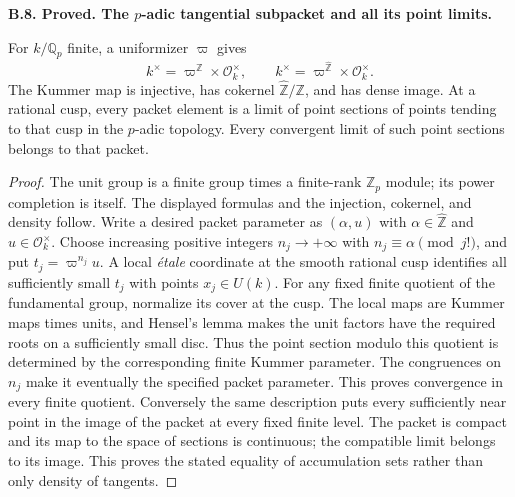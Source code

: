 \documentclass[11pt,oneside]{article}
\makeatletter
\newcounter{statementanchor}
\newenvironment{statement}[3]{%
 \refstepcounter{statementanchor}\def\@currentlabel{#1}%
 \par\addvspace{9pt}\noindent
 \textbf{#1. #2. #3.}\par\nobreak\noindent\ignorespaces
}{\par\addvspace{5pt}}
\makeatother
\begin{document}
\begin{statement}{B.8}{Proved}{The $p$-adic tangential subpacket and all its point limits}
\label{st:B.8}

For $k/\mathbb Q_p$ finite, a uniformizer $\varpi$ gives
\[
 k^\times=\varpi^{\mathbb Z}\times\mathcal O_k^\times,
 \qquad \widehat{k^\times}=\varpi^{\widehat{\mathbb Z}}
                         \times\mathcal O_k^\times.
\]
The Kummer map is injective, has cokernel
$\widehat{\mathbb Z}/\mathbb Z$, and has dense image.
At a rational cusp, every packet element is a limit of point sections
of points tending to that cusp in the $p$-adic topology.  Every
convergent limit of such point sections belongs to that packet.
\end{statement}
\begin{proof}
The unit group is a finite group times a finite-rank $\mathbb Z_p$
module; its power completion is itself.  The displayed formulas and
the injection, cokernel, and density follow.
Write a desired packet parameter as $(\alpha,u)$ with
$\alpha\in\widehat{\mathbb Z}$ and $u\in\mathcal O_k^\times$.
Choose increasing positive integers $n_j\to+\infty$ with
$n_j\equiv\alpha\pmod{j!}$, and put $t_j=\varpi^{n_j}u$.
A local \emph{\'etale} coordinate at the smooth rational cusp identifies
all sufficiently small $t_j$ with points $x_j\in U(k)$.
For any fixed finite quotient of the fundamental group, normalize
its cover at the cusp.  The local maps are Kummer maps times units,
and Hensel's lemma makes the unit factors have the required roots
on a sufficiently small disc.  Thus the point section modulo this
quotient is determined by the corresponding finite Kummer parameter.
The congruences on $n_j$ make it eventually the specified packet
parameter.  This proves convergence in every finite quotient.
Conversely the same description puts every sufficiently near point
in the image of the packet at every fixed finite level.  The packet
is compact and its map to the space of sections is continuous;
the compatible limit belongs to its image.  This proves the stated
equality of accumulation sets rather than only density of tangents.
\end{proof}
\end{document}
